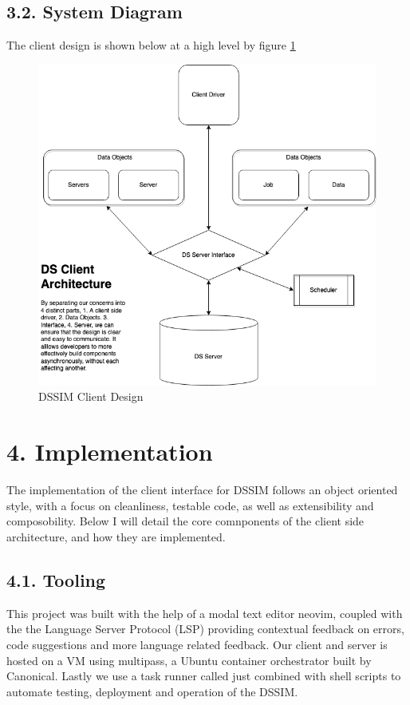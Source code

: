 \documentclass[a4paper]{article} %
\begin{document}
\subsection*{3.2. System Diagram}
The client design is shown below at a high level by figure \ref{CLIENT}
\begin{figure}[H]
    \centering
    \includegraphics[scale=0.7]{images/DSClient.png}
    \caption{DSSIM Client Design}
    \label{CLIENT}
\end{figure}

\section*{4. Implementation}
The implementation of the client interface for DSSIM follows an object oriented style, with a focus on cleanliness, testable code, as well as extensibility and composobility. Below I will detail the core comnponents of the client side architecture, and how they are implemented.

\subsection*{4.1. Tooling}
This project was built with the help of a modal text editor neovim\cite{neovim}, coupled with the the Language Server Protocol (LSP)\cite{lsp} providing contextual feedback on errors, code suggestions and more language related feedback. Our client and server is hosted on a VM using multipass, a Ubuntu container orchestrator built by Canonical\cite{multipass}. Lastly we use a task runner called just\cite{just} combined with shell scripts to automate testing, deployment and operation of the DSSIM.
\end{document}
